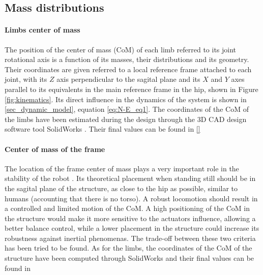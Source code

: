 
\subsection{Mass distributions} %
\label{sub:centers_of_mass}

\paragraph{Limbs center of mass} %
\label{par:limbs_center_of_mass}
The position of the center of mass (CoM) of each limb referred to its joint rotational axis is a function of its masses, their distributions and its geometry.
Their coordinates are given referred to a local reference frame attached to each joint, with its $Z$ axis perpendicular to the sagital plane and its $X$ and $Y$ axes parallel to its equivalents in the main reference frame in the hip, shown in Figure \ref{fig:kinematics}.
Its direct influence in the dynamics of the system is shown in \ref{sec_dynamic_model}, equation \ref{eq:N-E_eq1}.
The coordinates of the CoM of the limbs have been estimated during the design through the 3D CAD design software tool SolidWorks \cite{solidworks}.
Their final values can be found in \ref{} 


\paragraph{Center of mass of the frame} %
\label{par:center_of_mass_of_the_frame}
The location of the frame center of mass plays a very important role in the stability of the robot \cite{rojas}.
Its theoretical placement when standing still should be in the sagital plane of the structure, as close to the hip as possible, similar to humans (accounting that there is no torso).
A robust locomotion should result in a controlled and limited motion of the CoM. 
A high positioning of the CoM in the structure would make it more sensitive to the actuators influence, allowing a better balance control, while a lower placement in the structure could increase its robustness against inertial phenomenas.
The trade-off between these two criteria has been tried to be found.
As for the limbs, the coordinates of the CoM of the structure have been computed through SolidWorks and their final values can be found in %


